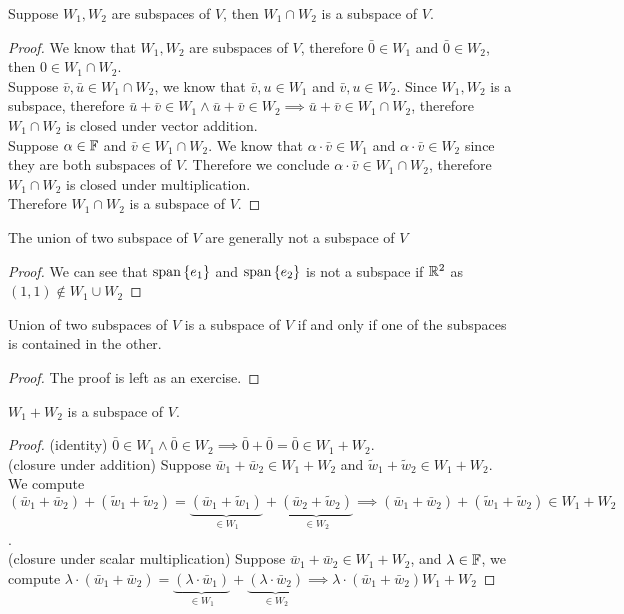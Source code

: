 \begin{theorem}
    Suppose $W_1,W_2$ are subspaces of $V$, then $W_1 \cap W_2$ is a subspace of $V$.
\end{theorem}
\begin{proof}
    We know that $W_1,W_2$ are subspaces of $V$, therefore $\bar 0 \in W_1$ and $\bar 0 \in W_2$, then $0 \in W_1 \cap W_2$. \\
    Suppose $\bar v,\bar u \in W_1 \cap W_2$, we know that $\bar v,u \in W_1$ and $\bar v,u \in W_2$. Since $W_1,W_2$ is a subspace, therefore $\bar u + \bar v \in W_1 \land \bar u + \bar v \in W_2 \implies \bar u + \bar v \in W_1 \cap W_2$, therefore $W_1 \cap W_2$ is closed under vector addition. \\ 
    Suppose $\alpha \in \mathbb F$ and $\bar v \in W_1 \cap W_2$. We know that $\alpha \cdot \bar v \in W_1$ and $\alpha \cdot \bar v \in W_2$ since they are both subspaces of $V$. Therefore we conclude $\alpha \cdot \bar v \in W_1 \cap W_2$, therefore $W_1 \cap W_2$ is closed under multiplication. \\
    Therefore $W_1 \cap W_2$ is a subspace of $V$.
\end{proof}
\begin{proposition}
    The union of two subspace of $V$ are generally not a subspace of $V$
\end{proposition}
\begin{proof}
    We can see that $\text{span} \left\{ e_1 \right\}$ and $\text{span} \left\{ e_2 \right\}$ is not a subspace if $\mathbb R^2$ as $(1,1) \not\in W_1 \cup W_2$ 
\end{proof}
\begin{theorem}
    Union of two subspaces of $V$ is a subspace of $V$ if and only if one of the subspaces is contained in the other.
\end{theorem}
\begin{proof}
    The proof is left as an exercise.
\end{proof}
\begin{theorem}
    $W_1 + W_2$ is a subspace of $V$.
\end{theorem}
\begin{proof}
    (identity) $\bar 0 \in W_1 \land \bar 0 \in W_2 \implies \bar 0 + \bar 0 = \bar 0 \in W_1 + W_2$. \\
    (closure under addition) Suppose $\bar w_1 + \bar w_2 \in W_1 + W_2$ and $\tilde w_1 + \tilde w_2 \in W_1 + W_2$. We compute $(\bar w_1 + \bar w_2) + (\tilde w_1 + \tilde w_2) = \underbrace{(\bar w_1 + \tilde w_1)}_{\in W_1} + \underbrace{(\bar w_2 + \tilde w_2)}_{\in W_2} \implies (\bar w_1 + \bar w_2) + (\tilde w_1 + \tilde w_2) \in W_1 + W_2$. \\
    (closure under scalar multiplication) Suppose $\bar w_1 + \bar w_2 \in W_1 + W_2$, and $\lambda \in \mathbb F$, we compute $\lambda \cdot (\bar w_1 + \bar w_2)  = \underbrace{(\lambda \cdot \bar w_1)}_{\in W_1} + \underbrace{(\lambda \cdot \bar w_2)}_{\in W_2} \implies \lambda \cdot (\bar w_1 + \bar w_2) W_1 + W_2$
\end{proof}
